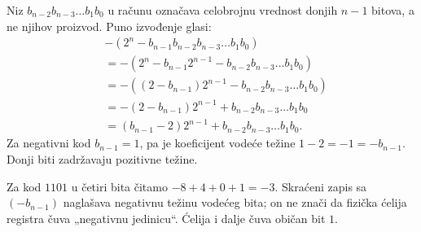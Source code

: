 
Niz $b_{n-2}b_{n-3}\ldots b_1b_0$ u računu označava celobrojnu vrednost donjih $n-1$ bitova, a ne njihov proizvod. Puno izvođenje glasi:
\[\begin{aligned}
&-\left(2^n-b_{n-1}b_{n-2}b_{n-3}\ldots b_1b_0\right)\\
&=-\left(2^n-b_{n-1}2^{n-1}-b_{n-2}b_{n-3}\ldots b_1b_0\right)\\
&=-\left((2-b_{n-1})2^{n-1}-b_{n-2}b_{n-3}\ldots b_1b_0\right)\\
&=-(2-b_{n-1})2^{n-1}+b_{n-2}b_{n-3}\ldots b_1b_0\\
&=(b_{n-1}-2)2^{n-1}+b_{n-2}b_{n-3}\ldots b_1b_0.
\end{aligned}\]
Za negativni kod $b_{n-1}=1$, pa je koeficijent vodeće težine $1-2=-1=-b_{n-1}$. Donji biti zadržavaju pozitivne težine.

Za kod $1101$ u četiri bita čitamo $-8+4+0+1=-3$. Skraćeni zapis sa $(-b_{n-1})$ naglašava negativnu težinu vodećeg bita; on ne znači da fizička ćelija registra čuva „negativnu jedinicu“. Ćelija i dalje čuva običan bit $1$.
